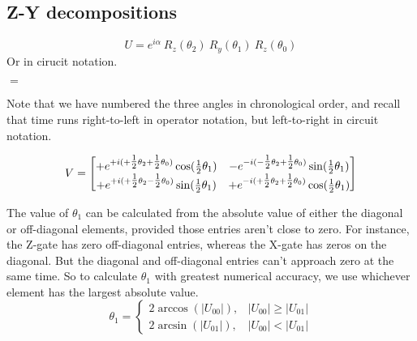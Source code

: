%
%


\subsection{Z-Y decompositions}

\[
U =  e^{i\alpha}\ R_z(\theta_2)\ R_y(\theta_1)\ R_z(\theta_0)
\]
Or in cirucit notation.
\begin{center}
$=$

\end{center}
Note that we have numbered the three angles in chronological order, and recall that time runs right-to-left in operator notation, but left-to-right in circuit notation. 

\[
V = 
\begin{bmatrix}
+e^{+i(+\tfrac{1}{2}\theta_2 + \tfrac{1}{2}\theta_0)} \cos(\tfrac{1}{2}\theta_1) 
& -e^{-i(-\tfrac{1}{2}\theta_2 + \tfrac{1}{2}\theta_0)} \sin(\tfrac{1}{2}\theta_1) 
\\
+e^{+i(+\tfrac{1}{2}\theta_2 - \tfrac{1}{2}\theta_0)} \sin(\tfrac{1}{2}\theta_1) 
& +e^{-i(+\tfrac{1}{2}\theta_2 +\tfrac{1}{2}\theta_0)} \cos(\tfrac{1}{2}\theta_1)
\end{bmatrix}
\]


The value of $\theta_1$ can be calculated from the absolute value of either the diagonal or off-diagonal elements, provided those entries aren't close to zero.
For instance, the Z-gate has zero off-diagonal entries, whereas the X-gate has zeros on the diagonal. But the diagonal and off-diagonal entries can't approach zero at the same time.  So to calculate $\theta_1$ with greatest numerical accuracy, we use whichever element has the largest absolute value.
\[
\theta_1 = 
  \begin{cases}
		2 \arccos(|U_{00}|), & |U_{00}| \geq |U_{01}|\\	
		2 \arcsin(|U_{01}|), & |U_{00}| < |U_{01}|		
	\end{cases} 
\]

